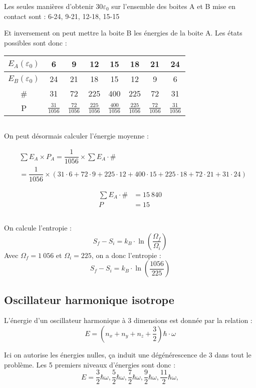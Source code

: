 \documentclass[12pt,a4paper]{article}
\begin{document}
Les seules manières d'obtenir \(30\varepsilon_0\) sur l'ensemble des boites A et B mise en contact sont :
6-24, 9-21, 12-18, 15-15 

Et inversement on peut mettre la boite B les énergies de la boite A.
Les états possibles sont donc :

\begin{center}

	\begin{tabular}{|c|c|c|c|c|c|c|c|}
		\hline 
		\(E_A(\varepsilon_0)\) & 6 & 9 & 12 & 15 & 18 & 21 & 24 \\ 
		\hline 
		\(E_B(\varepsilon_0)\) & 24 & 21 & 18 & 15 & 12 & 9 & 6 \\
		\hline
		\# & 31 & 72 & 225 & 400 & 225 & 72 & 31\\
		\hline 
		P & $\frac{31}{1056}$ & $\frac{72}{1056}$ & 	$\frac{225}{1056}$ & $\frac{400}{1056}$ 	& $		\frac{225}{1056}$ & $\frac{72}	{1056}$ & $	\frac{31}{1056}$ \\ 
		\hline 
	\end{tabular}

\end{center}

\subsection{}

On peut désormais calculer l'énergie moyenne :

\begin{align*}
	&\sum E_A \times P_A = \dfrac{1}{1056} \times \sum E_A \cdot \#\\
	&= \dfrac{1}{1056} \times \left( 31 \cdot 6 + 72 \cdot 9 + 225 \cdot 12 + 400 \cdot 15 + 225 \cdot 18 + 72 \cdot 21 + 31 \cdot 24\right)
\end{align*}

\begin{align*}
	\sum E_A \cdot \# &= 15~840\\
	P &= 15
\end{align*}

\subsection{}

On calcule l'entropie :
\[
	S_f - S_i = k_B \cdot \ln \left( \dfrac{\Omega_f}{\Omega_i} \right)
\]
Avec \(\Omega_f = 1~056\) et \(\Omega_i = 225\), on a donc l'entropie :
\[
	S_f - S_i = k_B \cdot \ln\left(\dfrac{1056}{225}\right)
\]

\subsection{Oscillateur harmonique isotrope}

L'énergie d'un oscillateur harmonique à 3 dimensions est donnée par la relation :
\[
	E = \left( n_x + n_y + n_z + \dfrac{3}{2} \right) \hbar \cdot \omega
\]

Ici on autorise les énergies nulles, ça induit une dégénérescence de 3 dans tout le problème.
Les 5 premiers niveaux d'énergies sont donc :
\[
	E = \frac{3}{2}\hbar \omega,\frac{5}{2}\hbar \omega,\frac{7}{2}\hbar \omega,\frac{9}{2}\hbar \omega,\frac{11}{2}\hbar \omega,
\]
\end{document}
